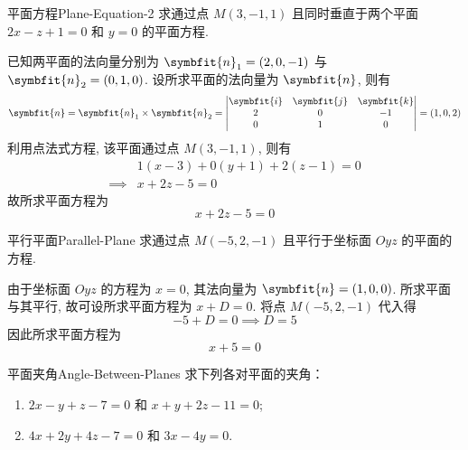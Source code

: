 \begin{problem}{平面方程}{Plane-Equation-2}
    求通过点 $M(3, -1, 1)$ 且同时垂直于两个平面 $2x - z + 1 = 0$ 和 $y = 0$ 的平面方程.
\end{problem}

\begin{solution}
    已知两平面的法向量分别为 $\symbfit{n}_1 = (2, 0, -1)$ 与 $\symbfit{n}_2 = (0, 1, 0)$. 设所求平面的法向量为 $\symbfit{n}$, 则有
    \begin{equation}
        \symbfit{n} = \symbfit{n}_1 \times \symbfit{n}_2 = \begin{vmatrix} \symbfit{i} & \symbfit{j} & \symbfit{k} \\ 2 & 0 & -1 \\ 0 & 1 & 0 \end{vmatrix} = (1, 0, 2)
    \end{equation}
    利用点法式方程, 该平面通过点 $M(3, -1, 1)$, 则有
    \begin{equation}
        \begin{aligned}
                     & 1(x - 3) + 0(y + 1) + 2(z - 1) = 0 \\
            \implies & x + 2z - 5 = 0
        \end{aligned}
    \end{equation}
    故所求平面方程为
    \begin{equation}
        \boxed{x + 2z - 5 = 0}
    \end{equation}
\end{solution}

\begin{problem}{平行平面}{Parallel-Plane}
    求通过点 $M(-5, 2, -1)$ 且平行于坐标面 $Oyz$ 的平面的方程.
\end{problem}

\begin{solution}
    由于坐标面 $Oyz$ 的方程为 $x = 0$, 其法向量为 $\symbfit{n} = (1, 0, 0)$. 所求平面与其平行, 故可设所求平面方程为 $x + D = 0$. 将点 $M(-5, 2, -1)$ 代入得
    \begin{equation}
        -5 + D = 0 \implies D = 5
    \end{equation}
    因此所求平面方程为
    \begin{equation}
        \boxed{x + 5 = 0}
    \end{equation}
\end{solution}

\begin{problem}{平面夹角}{Angle-Between-Planes}
    求下列各对平面的夹角：
    \begin{enumerate}
        \item $2x - y + z - 7 = 0$ 和 $x + y + 2z - 11 = 0$;
        \item $4x + 2y + 4z - 7 = 0$ 和 $3x - 4y = 0$.
    \end{enumerate}
\end{problem}


